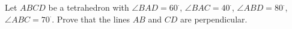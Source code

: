 Let $ABCD$ be a tetrahedron with $\angle BAD = 60^{\cdot}$, $\angle BAC = 40^{\cdot}$, $\angle ABD = 80^{\cdot}$, $\angle ABC = 70^{\cdot}$. Prove that the lines $AB$ and $CD$ are perpendicular.